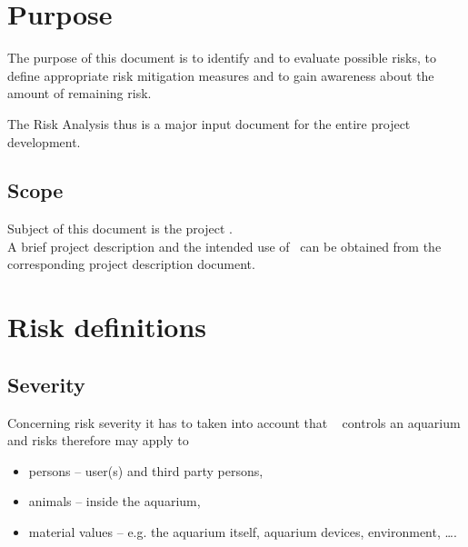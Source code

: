 \documentclass{../../git_submodules/common_docu/doc_class}
\author{\defaultAuthor}
\date{2019-04-04}
\begin{document}




  
  \section{Purpose}
  The purpose of this document is to identify and to evaluate possible risks, to define appropriate risk mitigation measures and to gain awareness about the amount of remaining risk.
  
  The Risk Analysis thus is a major input document for the entire project development.
  
  \subsection{Scope}
  Subject of this document is the project \textit{\ThisProjectName}. \\
  A brief project description and the intended use of \ThisProjectName~can be obtained from the corresponding project description document.
  \newpage
  
  \section{Risk definitions}

  \subsection{Severity}
  Concerning risk severity it has to taken into account that \ThisProjectName~ controls an aquarium and risks therefore may apply to 
  \begin{itemize}
    \item persons -- user(s) and third party persons,
    \item animals -- inside the aquarium,
    \item material values -- e.g. the aquarium itself, aquarium devices, environment, \dots.
  \end{itemize}
  
\end{document}
